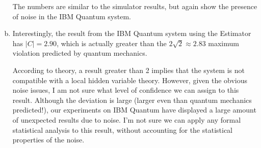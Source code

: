 \documentclass[12pt]{extarticle}
\begin{document}
\begin{enumerate}[(a)]
The numbers are similar to the simulator results, but again show the presence of noise in the IBM Quantum system.

\item

Interestingly, the result from the IBM Quantum system using the Estimator has $|C|=2.90$, which is actually greater than
the $2\sqrt{2}\approx 2.83$ maximum violation predicted by quantum mechanics.

According to theory, a result greater than 2 implies that the system is not compatible with a local hidden variable theory.
However, given the obvious noise issues, I am not sure what level of confidence we can assign to this result.
Although the deviation is large (larger even than quantum mechanics predicted!), our experiments on IBM Quantum
have displayed a large amount of unexpected results due to noise.
I'm not sure we can apply any formal statistical analysis to this result, without accounting for the statistical properties of the noise.

\end{enumerate}

\end{document}
